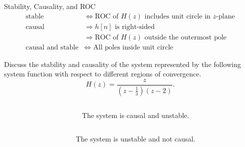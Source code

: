 \begin{frame}{Stability, Causality, and ROC}
    \begin{align*}
         \text{stable} &\Leftrightarrow \text{ROC of $H(z)$ includes unit circle in $z$-plane}\\
         \text{causal} &\Rightarrow \text{$h[n]$ is right-sided}\\
         &\Rightarrow \text{ROC of $H(z)$ outside the outermost pole}\\
         \text{causal and stable} &\Leftrightarrow \text{ All poles inside unit circle}
    \end{align*}
\end{frame}

\begin{frame}{}
    \begin{example}
        Discuss the stability and causality of the system represented by the following system function with respect to different regions of convergence.
        \begin{equation*}
            H(z) = \frac{z}{\left(z-\frac{1}{3}\right)(z-2)}.
        \end{equation*}
    \end{example}
\end{frame}

\begin{frame}{}
    \begin{columns}
        \begin{column}{3in}
            \begin{center}
                
            \end{center}
        \end{column}
        \begin{column}{2in}
            \pause
            The system is causal and unstable.
        \end{column}
    \end{columns}
\end{frame}



\begin{frame}{}
    \begin{columns}
        \begin{column}{3in}
            \begin{center}
                
            \end{center}
        \end{column}
        \begin{column}{2in}
            \pause
            The system is unstable and not causal.
        \end{column}
    \end{columns}
\end{frame}

